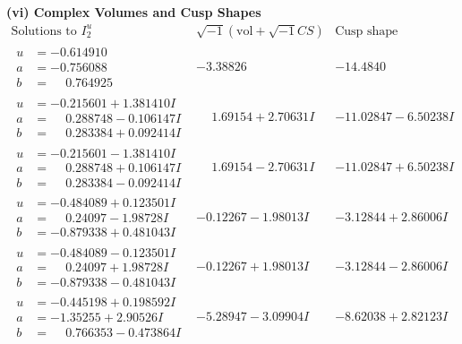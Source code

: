 \documentclass[1p]{elsarticle_modified}
\theoremstyle{definition}
\newcommand{\I}{\sqrt{-1}}
\begin{document}
\newpage\flushleft \textbf{(vi) Complex Volumes and Cusp Shapes}
$$\begin{array}{c|c|c}  
\text{Solutions to }I^u_{2}& \I (\text{vol} + \sqrt{-1}CS) & \text{Cusp shape}\\
 \hline 
\begin{aligned}
u &= -0.614910\phantom{ +0.000000I} \\
a &= -0.756088\phantom{ +0.000000I} \\
b &= \phantom{-}0.764925\phantom{ +0.000000I}\end{aligned}
 & -3.38826\phantom{ +0.000000I} & -14.4840\phantom{ +0.000000I} \\ \hline\begin{aligned}
u &= -0.215601 + 1.381410 I \\
a &= \phantom{-}0.288748 - 0.106147 I \\
b &= \phantom{-}0.283384 + 0.092414 I\end{aligned}
 & \phantom{-}1.69154 + 2.70631 I & -11.02847 - 6.50238 I \\ \hline\begin{aligned}
u &= -0.215601 - 1.381410 I \\
a &= \phantom{-}0.288748 + 0.106147 I \\
b &= \phantom{-}0.283384 - 0.092414 I\end{aligned}
 & \phantom{-}1.69154 - 2.70631 I & -11.02847 + 6.50238 I \\ \hline\begin{aligned}
u &= -0.484089 + 0.123501 I \\
a &= \phantom{-}0.24097 - 1.98728 I \\
b &= -0.879338 + 0.481043 I\end{aligned}
 & -0.12267 - 1.98013 I & -3.12844 + 2.86006 I \\ \hline\begin{aligned}
u &= -0.484089 - 0.123501 I \\
a &= \phantom{-}0.24097 + 1.98728 I \\
b &= -0.879338 - 0.481043 I\end{aligned}
 & -0.12267 + 1.98013 I & -3.12844 - 2.86006 I \\ \hline\begin{aligned}
u &= -0.445198 + 0.198592 I \\
a &= -1.35255 + 2.90526 I \\
b &= \phantom{-}0.766353 - 0.473864 I\end{aligned}
 & -5.28947 - 3.09904 I & -8.62038 + 2.82123 I \\ \hline\begin{aligned}

\end{aligned}
\end{array}$$
\end{document}
